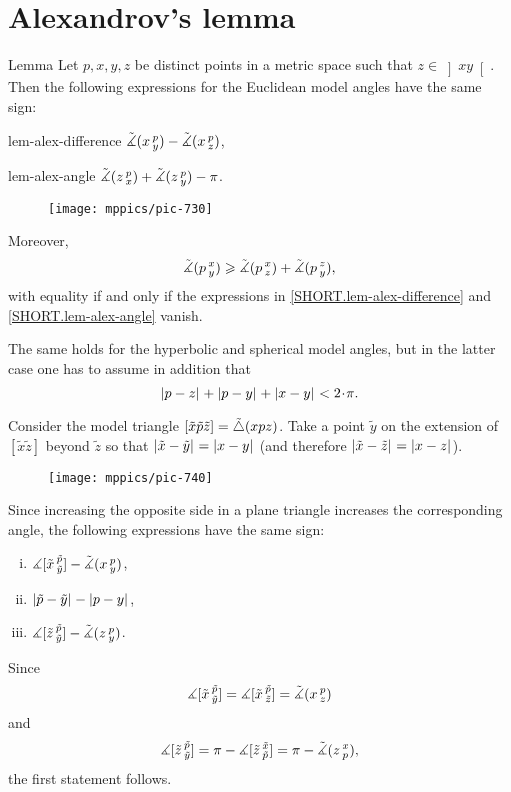 \section{Alexandrov's lemma}

\begin{thm}{Lemma}
\label{lem:alex}  
Let $p,x,y,z$ be distinct points in a metric space such that $z\in \left]x y\right[$.
Then 
the following expressions for the Euclidean model angles have the same sign:

\begin{subthm}{lem-alex-difference}
$\tilde\measuredangle(x\,{}^{p}_{y})
-\tilde\measuredangle(x\,{}^{p}_{z})$,
\end{subthm} 

\begin{subthm}{lem-alex-angle}
$\tilde\measuredangle(z\,{}^{p}_{x})
+\tilde\measuredangle(z\,{}^{p}_{y}) -\pi$.
\end{subthm}

\begin{wrapfigure}{r}{25mm}
\vskip-0mm
\centering
\texttt{[image: mppics/pic-730]}
\end{wrapfigure}

Moreover,
\[\tilde\measuredangle(p\,{}^{x}_{y}) \geqslant \tilde\measuredangle(p\,{}^{x}_{z}) +  \tilde\measuredangle(p\,{}^{z}_{y}),\]
with equality if and only if the expressions in \ref{SHORT.lem-alex-difference} and \ref{SHORT.lem-alex-angle} vanish.

The same holds for the hyperbolic and spherical model angles, 
but in the latter case one has to assume in addition that
\[\dist{p}{z}{}+\dist{p}{y}{}+\dist{x}{y}{}< 2\cdot\pi.\]

\end{thm}


Consider the model triangle $[\tilde x\tilde p\tilde z]=\tilde\triangle(x p z)$.
Take 
a point $\tilde y$ on the extension of 
$[\tilde x \tilde z]$ beyond $\tilde z$ so that $\dist{\tilde x}{\tilde y}{}=\dist{x}{y}{}$ (and therefore $\dist{\tilde x}{\tilde z}{}=\dist{x}{z}{}$). 

\begin{wrapfigure}{r}{33mm}
\vskip-0mm
\centering
\texttt{[image: mppics/pic-740]}
\end{wrapfigure}

Since increasing the opposite side in a plane triangle increases the corresponding angle, 
the following expressions have the same sign:
\begin{enumerate}[(i)]
\item $\measuredangle[\tilde x\,{}^{\tilde p}_{\tilde y}]-\tilde\measuredangle(x\,{}^{p}_{y})$,
\item $\dist{\tilde p}{\tilde y}{}-\dist{p}{y}{}$,
\item $\measuredangle[\tilde z\,{}^{\tilde p}_{\tilde y}]-\tilde\measuredangle(z\,{}^{p}_{y})$.
\end{enumerate}
Since 
\[\measuredangle[\tilde x\,{}^{\tilde p}_{\tilde y}]=\measuredangle[\tilde x\,{}^{\tilde p}_{\tilde z}]=\tilde\measuredangle(x\,{}^{p}_{z})\]
and
\[ \measuredangle[\tilde z\,{}^{\tilde p}_{\tilde y}]
=\pi-\measuredangle[\tilde z\,{}^{\tilde x}_{\tilde p}]
=\pi-\tilde\measuredangle(z\,{}^{x}_{p}),\]
the first statement follows.


